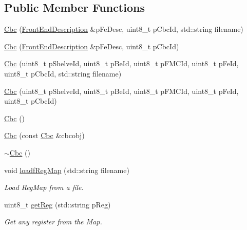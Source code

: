 \subsection*{Public Member Functions}
\begin{DoxyCompactItemize}
\item 
\hyperlink{class_ph2___hw_description_1_1_cbc_a88c9c022e04628b60495b94df2ab0825}{Cbc} (\hyperlink{class_ph2___hw_description_1_1_front_end_description}{Front\-End\-Description} \&p\-Fe\-Desc, uint8\-\_\-t p\-Cbc\-Id, std\-::string filename)
\item 
\hyperlink{class_ph2___hw_description_1_1_cbc_ae5f520d7733b7b92bc19805e39d5da66}{Cbc} (\hyperlink{class_ph2___hw_description_1_1_front_end_description}{Front\-End\-Description} \&p\-Fe\-Desc, uint8\-\_\-t p\-Cbc\-Id)
\item 
\hyperlink{class_ph2___hw_description_1_1_cbc_ad2ec420b5bd8e361a151b585a62c0ebe}{Cbc} (uint8\-\_\-t p\-Shelve\-Id, uint8\-\_\-t p\-Be\-Id, uint8\-\_\-t p\-F\-M\-C\-Id, uint8\-\_\-t p\-Fe\-Id, uint8\-\_\-t p\-Cbc\-Id, std\-::string filename)
\item 
\hyperlink{class_ph2___hw_description_1_1_cbc_ac7e237f12e6950b45538e3706be11bb0}{Cbc} (uint8\-\_\-t p\-Shelve\-Id, uint8\-\_\-t p\-Be\-Id, uint8\-\_\-t p\-F\-M\-C\-Id, uint8\-\_\-t p\-Fe\-Id, uint8\-\_\-t p\-Cbc\-Id)
\item 
\hyperlink{class_ph2___hw_description_1_1_cbc_a5b7124456823871d611ada17ed0a51a1}{Cbc} ()
\item 
\hyperlink{class_ph2___hw_description_1_1_cbc_ab529cbb8cbbbc3b28a7ca2a472d4aa50}{Cbc} (const \hyperlink{class_ph2___hw_description_1_1_cbc}{Cbc} \&cbcobj)
\item 
\hyperlink{class_ph2___hw_description_1_1_cbc_a4e641d292073978e6e1b34fa91c13067}{$\sim$\-Cbc} ()
\item 
void \hyperlink{class_ph2___hw_description_1_1_cbc_afd6fdbe40eff3c160221a3a8acfb657d}{loadf\-Reg\-Map} (std\-::string filename)
\begin{DoxyCompactList}\small\item\em Load Reg\-Map from a file. \end{DoxyCompactList}\item 
uint8\-\_\-t \hyperlink{class_ph2___hw_description_1_1_cbc_a8e29ea3bf86977585b3824941d948f91}{get\-Reg} (std\-::string p\-Reg)
\begin{DoxyCompactList}\small\item\em Get any register from the Map. \end{DoxyCompactList}\item 

\end{DoxyCompactItemize}
